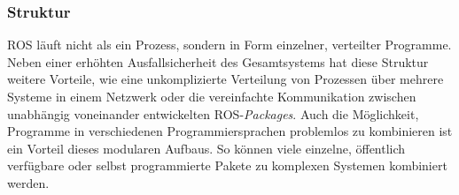 \subsubsection{Struktur}

\ac{ROS} läuft nicht als ein Prozess, sondern in Form einzelner, verteilter Programme. Neben einer erhöhten Ausfallsicherheit des Gesamtsystems hat diese Struktur weitere Vorteile, wie eine unkomplizierte Verteilung von Prozessen über mehrere Systeme in einem Netzwerk oder die vereinfachte Kommunikation zwischen unabhängig voneinander entwickelten \ac{ROS}-\textit{Packages}. Auch die Möglichkeit, Programme in verschiedenen Programmiersprachen problemlos zu kombinieren ist ein Vorteil dieses modularen Aufbaus. So können viele einzelne, öffentlich verfügbare oder selbst programmierte Pakete zu komplexen Systemen kombiniert werden. 

